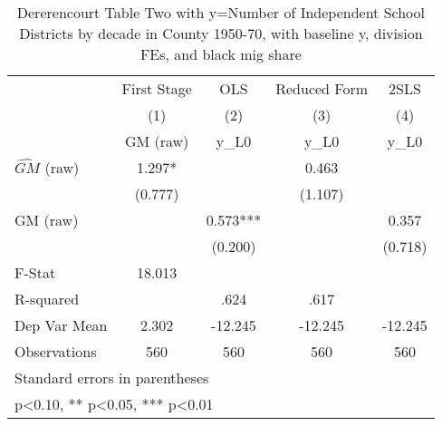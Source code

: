 \begin{table}[htbp]\centering
\def\sym#1{\ifmmode^{#1}\else\(^{#1}\)\fi}
\caption{Dererencourt Table Two with y=Number of Independent School Districts by decade in County 1950-70, with baseline y, division FEs, and black mig share}
\begin{tabular}{l*{4}{c}}
\toprule
                    & First Stage   &         OLS   &Reduced Form   &        2SLS   \\
                    &\multicolumn{1}{c}{(1)}&\multicolumn{1}{c}{(2)}&\multicolumn{1}{c}{(3)}&\multicolumn{1}{c}{(4)}\\
                    &\multicolumn{1}{c}{GM  (raw)}&\multicolumn{1}{c}{y\_L0}&\multicolumn{1}{c}{y\_L0}&\multicolumn{1}{c}{y\_L0}\\
\midrule
$\hat{GM}$ (raw)    &       1.297*  &               &       0.463   &               \\
                    &     (0.777)   &               &     (1.107)   &               \\
\addlinespace
GM  (raw)           &               &       0.573***&               &       0.357   \\
                    &               &     (0.200)   &               &     (0.718)   \\
\midrule
F-Stat              &      18.013   &               &               &               \\
R-squared           &               &        .624   &        .617   &               \\
Dep Var Mean        &       2.302   &     -12.245   &     -12.245   &     -12.245   \\
Observations        &         560   &         560   &         560   &         560   \\
\bottomrule
\multicolumn{5}{l}{\footnotesize Standard errors in parentheses}\\
\multicolumn{5}{l}{\footnotesize * p<0.10, ** p<0.05, *** p<0.01}\\
\end{tabular}
\end{table}
